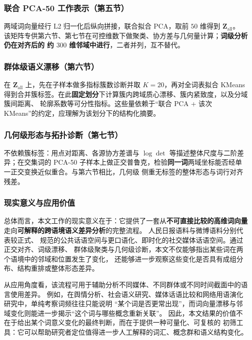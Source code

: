 \documentclass[withoutpreface]{cumcmthesis}
\begin{document}
\subsubsection{联合 PCA-50 工作表示（第五节）}
两域词向量经行 L2 归一化后纵向拼接，联合拟合 PCA，取前 $50$ 维得到 $\mathbf{Z}_{\mathrm{all}}$。
该矩阵专供第六节、第七节在可控维数下做聚类、协方差与几何量计算；\textbf{词级分析仍在对齐后的
约 $300$ 维邻域中进行}，二者并列，互不替代。

\subsubsection{群体级语义漂移（第六节）}
在 $\mathbf{Z}_{\mathrm{all}}$ 上，先在子样本做多指标簇数诊断并取 $K{=}20$，再对全词表拟合
KMeans 得到合并簇标签。在此\textbf{固定划分}下计算簇内跨域质心漂移、簇内紧致度，以及分域簇间距离、
轮廓系数等可分性指标。这些量依赖于“联合 PCA + 该次 KMeans”的约定，应理解为该划分下的结构化摘要。

\subsubsection{几何级形态与拓扑诊断（第七节）}
不依赖簇标签：用点对距离、各源协方差谱与 $\log\det$ 等描述整体尺度与二阶差异；在交集词的 PCA-50
子样本上做正交普鲁克，检验\textbf{同一词}两域坐标能否经单一正交变换近似重合。与第六节相比，几何级
侧重无标签的整体形态与词行对齐残差。


\subsubsection{现实意义与应用价值}
总体而言，本文工作的现实意义在于：它提供了一套从\textbf{不可直接比较的高维词向量}
走向\textbf{可解释的跨语境语义差异分析}的完整流程。 人民日报语料与微博语料分别代表较正式、
规范的公共话语空间与更口语化、即时化的社交媒体话语空间。通过正交对齐、词级漂移、
群体级聚类与几何级诊断，本文不仅能够指出某些词在两个语境中的邻域和位置发生了变化，
还能够进一步观察这些变化是否具有成组分布、结构重排或整体形态差异。

从应用角度看，该流程可用于辅助分析不同媒体、不同群体或不同时间截面中的语言使用差异。
例如，在舆情分析、社会语义研究、媒体话语比较和网络用语演化研究中，单纯考察词频往往只能说明
“某个词是否更常出现”，而词向量漂移与邻域变化则能进一步揭示“这个词与哪些概念重新关联”。
因此，本文结果的价值不在于给出某个词意义变化的最终判断，而在于提供一种可量化、可复核的
初筛工具：它可以帮助研究者定位值得进一步人工解释的词汇、概念群和语义结构变化。
\end{document}
